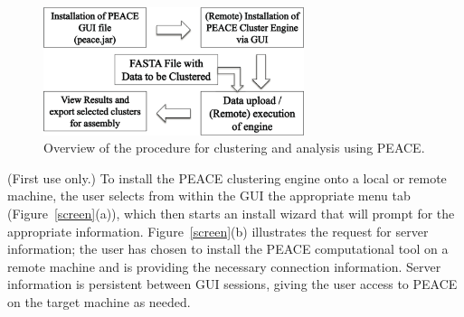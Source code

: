 \documentclass[a4,center,fleqn]{NAR}
\newcommand{\peace} {{\small PEACE}}
\begin{document}
\begin{figure}
  \centerline{\includegraphics[width=3in]{pics.d/workflow.png}}
  \caption{Overview of the procedure for clustering and analysis using
    \peace.}\label{fig:workflow}
\end{figure}


 (First use only.) To install the
\peace\/ clustering engine onto a local or remote machine, the user selects
from within the GUI the appropriate menu tab (Figure~\ref{screen}(a)),
which then starts an install wizard that will prompt for the
appropriate information.  Figure~\ref{screen}(b) illustrates the
request for server information; the user has chosen to install the
\peace\/ computational tool on a remote machine and is providing
the necessary connection information.  Server information is
persistent between GUI sessions, giving the user access to \peace\/
on the target machine as needed.
\end{document}
